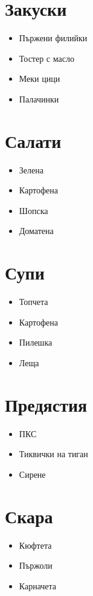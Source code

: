 \documentclass{article}
\begin{document}
\section{Закуски}
\begin{itemize}
    \item{Пържени филийки}
    \item{Тостер с масло}
    \item{Меки цици}
    \item{Палачинки}
\end{itemize}

\section{Салати}
\begin{itemize}
    \item{Зелена}
    \item{Картофена}
    \item{Шопска}
    \item{Доматена}
\end{itemize}

\section{Супи}
\begin{itemize}
    \item{Топчета}
    \item{Картофена}
    \item{Пилешка}
    \item{Леща}
\end{itemize}

\section{Предястия}
\begin{itemize}
    \item{ПКС}
    \item{Тиквички на тиган}
    \item{Сирене}
\end{itemize}

\section{Скара}
\begin{itemize}
    \item{Кюфтета}
    \item{Пържоли}
    \item{Карначета}
\end{itemize}
\end{document}
